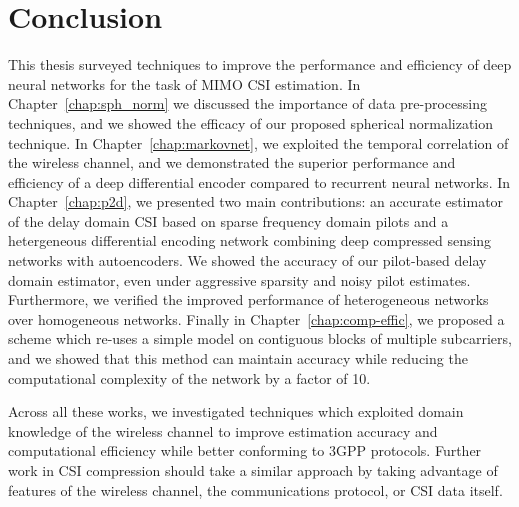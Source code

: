 \chapter{Conclusion} \label{chap:conclusion}

This thesis surveyed techniques to improve the performance and efficiency of deep neural networks for the task of MIMO CSI estimation. In Chapter~\ref{chap:sph_norm} we discussed the importance of data pre-processing techniques, and we showed the efficacy of our proposed spherical normalization technique. In Chapter~\ref{chap:markovnet}, we exploited the temporal correlation of the wireless channel, and we demonstrated the superior performance and efficiency of a deep differential encoder compared to recurrent neural networks. In Chapter~\ref{chap:p2d}, we presented two main contributions: an accurate estimator of the delay domain CSI based on sparse frequency domain pilots and a hetergeneous differential encoding network combining deep compressed sensing networks with autoencoders. We showed the accuracy of our pilot-based delay domain estimator, even under aggressive sparsity and noisy pilot estimates. Furthermore, we verified the improved performance of heterogeneous networks over homogeneous networks. Finally in Chapter~\ref{chap:comp-effic}, we proposed a scheme which re-uses a simple model on contiguous blocks of multiple subcarriers, and we showed that this method can maintain accuracy while reducing the computational complexity of the network by a factor of 10.  

Across all these works, we investigated techniques which exploited domain knowledge of the wireless channel to improve estimation accuracy and computational efficiency while better conforming to 3GPP protocols. Further work in CSI compression should take a similar approach by taking advantage of features of the wireless channel, the communications protocol, or CSI data itself.